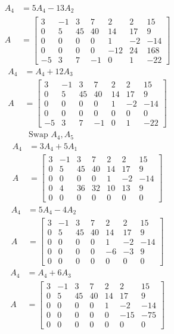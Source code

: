 \documentclass{article}
\begin{document}
\begin{align*}
	A_4 & = 5A_4 - 13A_2 \\
	A & = \begin{bmatrix}
		3 & -1 & 3 & 7 & 2 & 2 & 15 \\
		0 & 5 & 45 & 40 & 14 & 17 & 9 \\
		0 & 0 & 0 & 0 & 1 & -2 & -14 \\
		0 & 0 & 0 & 0 & -12 & 24 & 168 \\
		-5 & 3 & 7 & -1 & 0 & 1 & -22
	\end{bmatrix}
\end{align*}
\begin{align*}
	A_4 & = A_4 + 12A_3 \\
	A & = \begin{bmatrix}
		3 & -1 & 3 & 7 & 2 & 2 & 15 \\
		0 & 5 & 45 & 40 & 14 & 17 & 9 \\
		0 & 0 & 0 & 0 & 1 & -2 & -14 \\
		0 & 0 & 0 & 0 & 0 & 0 & 0 \\
		-5 & 3 & 7 & -1 & 0 & 1 & -22
	\end{bmatrix}
\end{align*}
\begin{align*}
	& \text{Swap } A_4, A_5 \\
	A_4 & = 3A_4 + 5A_1 \\
	A & = \begin{bmatrix}
		3 & -1 & 3 & 7 & 2 & 2 & 15 \\
		0 & 5 & 45 & 40 & 14 & 17 & 9 \\
		0 & 0 & 0 & 0 & 1 & -2 & -14 \\
		0 & 4 & 36 & 32 & 10 & 13 & 9 \\
		0 & 0 & 0 & 0 & 0 & 0 & 0
	\end{bmatrix}
\end{align*}
\begin{align*}
	A_4 & = 5A_4 - 4A_2 \\
	A & = \begin{bmatrix}
		3 & -1 & 3 & 7 & 2 & 2 & 15 \\
		0 & 5 & 45 & 40 & 14 & 17 & 9 \\
		0 & 0 & 0 & 0 & 1 & -2 & -14 \\
		0 & 0 & 0 & 0 & -6 & -3 & 9 \\
		0 & 0 & 0 & 0 & 0 & 0 & 0
	\end{bmatrix}
\end{align*}
\begin{align*}
	A_4 & = A_4 + 6A_3 \\
	A & = \begin{bmatrix}
		3 & -1 & 3 & 7 & 2 & 2 & 15 \\
		0 & 5 & 45 & 40 & 14 & 17 & 9 \\
		0 & 0 & 0 & 0 & 1 & -2 & -14 \\
		0 & 0 & 0 & 0 & 0 & -15 & -75 \\
		0 & 0 & 0 & 0 & 0 & 0 & 0
	\end{bmatrix}
\end{align*}
\end{document}
